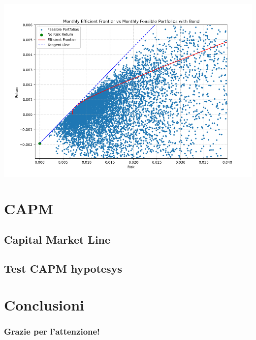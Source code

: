 \documentclass[compress]{beamer}
\begin{document}
\begin{frame}{\subsecname}
\begin{minipage}{0.30\textwidth}
		\includegraphics[width=0.95\linewidth]{images/Monthly Efficient Frontier vs Monthly Feasible Portfolios with Bond.png}
	\end{minipage}
\end{frame}

\section{CAPM}

\subsection{Capital Market Line}
\begin{frame}{\subsecname}
\end{frame}

\subsection{Test CAPM hypotesys}
\begin{frame}{\subsecname}
\end{frame}

\section{Conclusioni}
\begin{frame}
	\frametitle{Grazie per l'attenzione!}
\end{frame}
\end{document}
